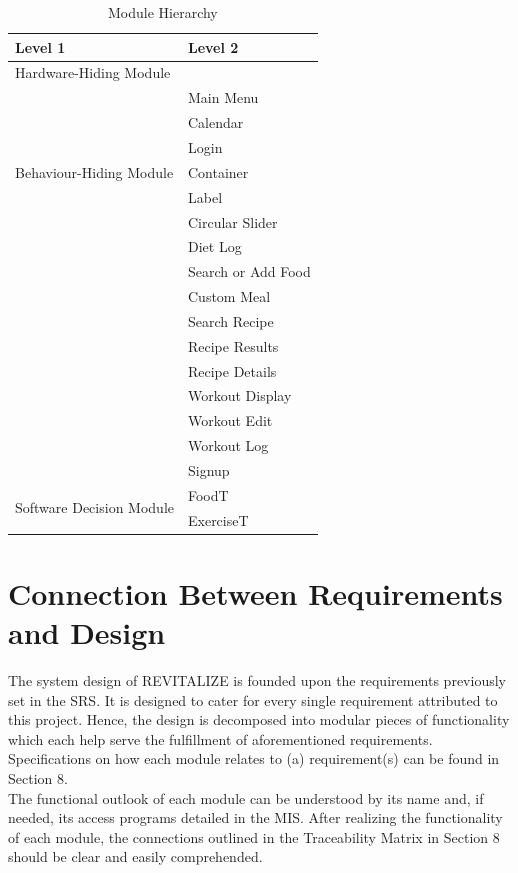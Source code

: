 \documentclass[12pt, titlepage]{article}
\begin{document}
\begin{table}[h!]
	\centering
	\begin{tabular}{p{} p{}}
		\toprule
		\textbf{Level 1} & \textbf{Level 2}\\
		\midrule
		
		{Hardware-Hiding Module} & ~ \\
		\midrule
		
		\multirow{7}{0.3\textwidth}{Behaviour-Hiding Module} & Main Menu\\
		& Calendar\\
		& Login\\
		& Container\\
		& Label\\
		& Circular Slider\\
		& Diet Log\\ 
		& Search or Add Food\\
		& Custom Meal\\
		& Search Recipe\\
		& Recipe Results\\
		& Recipe Details\\
		& Workout Display\\
		& Workout Edit\\
		& Workout Log\\
		& Signup\\
		\midrule
		
		\multirow{3}{0.3\textwidth}{Software Decision Module} & FoodT\\
		& ExerciseT\\
		\bottomrule
		
	\end{tabular}
	\caption{Module Hierarchy}
	\label{TblMH}
\end{table}

\section{Connection Between Requirements and Design} \label{SecConnection}

The system design of REVITALIZE is founded upon the requirements previously set in the SRS. It is designed to cater for every single requirement attributed to this project. Hence, the design is decomposed into modular pieces of functionality which each help serve the fulfillment of aforementioned requirements. Specifications on how each module relates to (a) requirement(s) can be found in Section 8.\\
The functional outlook of each module can be understood by its name and, if needed, its access programs detailed in the MIS. After realizing the functionality of each module, the connections outlined in the Traceability Matrix in Section 8 should be clear and easily comprehended.
\end{document}
